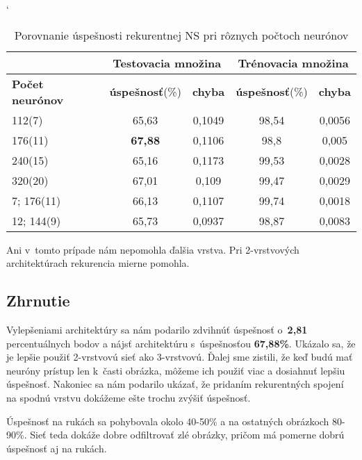 \begin{table}[htp]
\catcode` %
\centering
\begin{tabular}{|l|c|c|c|c|}
\cline{2-5}
\multicolumn{1}{l}{} & \multicolumn{2}{|c|}{\textbf{Testovacia množina}} & \multicolumn{2}{c|}{\textbf{Trénovacia množina}}\\ 
\hline
\textbf{Počet neurónov} & \textbf{úspešnosť}(\%) & \textbf{chyba} & \textbf{úspešnosť}(\%) & \textbf{chyba} \\ \hline
112(7) & 65,63 & 0,1049 & 98,54 & 0,0056  \\ \hline
176(11) & \textbf{67,88} & 0,1106 & 98,8 & 0,005  \\ \hline
240(15) & 65,16 & 0,1173 & 99,53 & 0,0028  \\ \hline
320(20) & 67,01 & 0,109 & 99,47 & 0,0029 \\ \hline
7; 176(11) & 66,13 & 0,1107 & 99,74 & 0,0018 \\ \hline
12; 144(9) & 65,73 & 0,0937 & 98,87 & 0,0083 \\ \hline
\end{tabular}
\caption{Porovnanie úspešnosti rekurentnej NS pri rôznych počtoch neurónov}
\label{tab:neuroncountcmp3}
\end{table}

Ani v~tomto prípade nám nepomohla ďalšia vrstva. Pri 2-vrstvových architektúrach rekurencia mierne pomohla.

\subsection{Zhrnutie}

Vylepšeniami architektúry sa nám podarilo zdvihnúť úspešnosť o~\textbf{2,81} percentuálnych bodov a nájsť architektúru s~úspešnosťou \textbf{67,88\%}. Ukázalo sa, že je lepšie použiť 2-vrstvovú sieť ako 3-vrstvovú. Ďalej sme zistili, že keď budú mať neuróny prístup len k~časti obrázka, môžeme ich použiť viac a dosiahnuť lepšiu úspešnosť. Nakoniec sa nám podarilo ukázať, že pridaním rekurentných spojení na spodnú vrstvu dokážeme ešte trochu zvýšiť úspešnosť.

Úspešnosť na rukách sa pohybovala okolo 40-50\% a na ostatných obrázkoch 80-90\%. Sieť teda dokáže dobre odfiltrovať zlé obrázky, pričom má pomerne dobrú úspešnosť aj na rukách.

